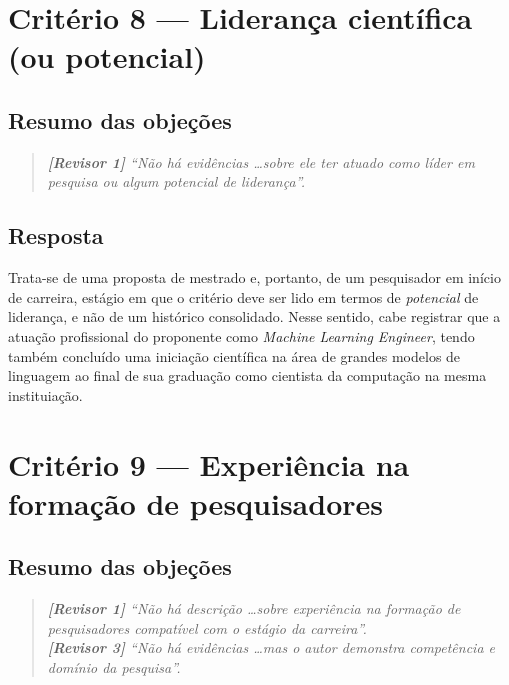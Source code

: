 \documentclass{article}
\newenvironment{parecer}
{\begin{quote}\itshape\color{gray!70!black}\small}
	{\end{quote}}
\newcommand{\revisor}[1]{\textbf{[Revisor #1]}}
\begin{document}
	\section{Critério 8 --- Liderança científica (ou potencial)}
	
	\subsection{Resumo das objeções}
	\begin{parecer}
		\revisor{1} ``Não há evidências \ldots sobre ele ter atuado como líder
		em pesquisa ou algum potencial de liderança''.
	\end{parecer}
	
	\subsection{Resposta}
	
	Trata-se de uma proposta de mestrado e, portanto, de um pesquisador em início de
	carreira, estágio em que o critério deve ser lido em termos de \emph{potencial}
	de liderança, e não de um histórico consolidado. Nesse sentido, cabe registrar
	que a atuação profissional do proponente como \textit{Machine Learning Engineer}, tendo também concluído uma iniciação científica na área de grandes modelos de linguagem ao final de sua graduação como cientista da computação na mesma instituiação.
	
	\section{Critério 9 --- Experiência na formação de pesquisadores}
	
	\subsection{Resumo das objeções}
	\begin{parecer}
		\revisor{1} ``Não há descrição \ldots sobre experiência na formação de
		pesquisadores compatível com o estágio da carreira''.\\
		\revisor{3} ``Não há evidências \ldots mas o autor demonstra competência e
		domínio da pesquisa''.
	\end{parecer}
	
\end{document}
